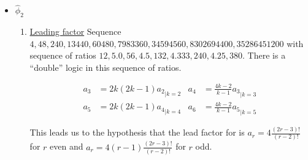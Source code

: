 \documentclass[a4paper, 11pt]{article}
\begin{document}
\begin{itemize}
    \item $\hat{\phi}_2$
    
    \begin{enumerate}
      \item \underline{Leading factor}
        Sequence $4, 48, 240, 13440, 60480, 7983360, 34594560, 8302694400, 35286451200$ with sequence of ratios $12, 
        5.0, 56, 4.5, 132, 4.333, 240, 4.25, 380$. There is a “double” logic in this sequence of ratios.  
        
        \begin{align*}
          a_3 & = {2k(2k-1)a_2}_{|k=2}  & a_4 &= {\frac{4k-2}{k-1}a_3}_{|k=3} \\
          a_5 & = {2k(2k-1)a_4}_{|k=4}  & a_6 &= {\frac{4k-2}{k-1}a_5}_{|k=5}
        \end{align*}
       
        This leads us to the hypothesis that the lead factor for is $a_r = 4\frac{(2r-3)!}{(r-2)!}$ for $r$ even and 
        $a_r = 4(r-1) \frac{(2r-3)!}{(r-2)!}$ for $r$ odd. \\
    

\end{enumerate}
\end{itemize}
\end{document}

